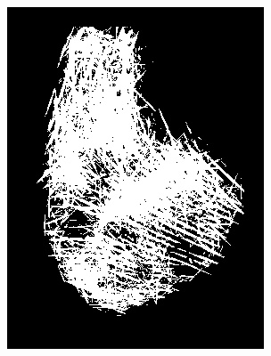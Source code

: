 \documentclass{beamer}
\begin{document}
{\begin{figure}[!ht]
\begin{subfigure}[ht]{0.15\textwidth}
            \includegraphics[width=\textwidth]{fingerprints/2004Db4a/1_3_mask.jpg}
        \end{subfigure}
        \qquad
        \begin{subfigure}[ht]{0.15\textwidth}

\end{subfigure}
\end{figure}}
\end{document}

